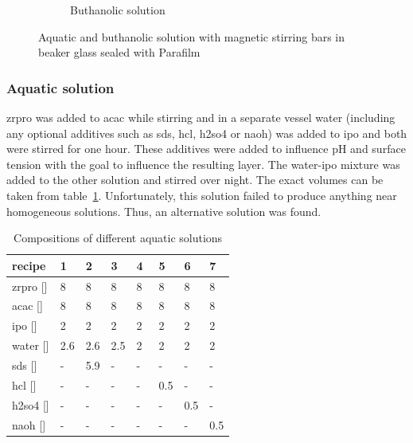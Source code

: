 \begin{figure}[htb]
\begin{subfigure}{0.49\textwidth}
		\label{fig:sol-bu}
		\caption{Buthanolic solution}
	\end{subfigure}
	\label{fig:sol}
	\caption{Aquatic and buthanolic solution with magnetic stirring bars in beaker glass sealed with Parafilm} 
\end{figure}

\subsubsection{Aquatic solution}
\gls{zrpro} was added to \gls{acac} while stirring and in a separate vessel \gls{water} 
(including any optional additives such as \gls{sds}, \gls{hcl}, \gls{h2so4} or \gls{naoh}) 
was added to \gls{ipo} and both were stirred for one hour. 
These additives were added to influence pH and surface tension with the goal to influence the resulting layer.
The \gls{water}-\gls{ipo} mixture was added to the other solution and stirred over night. 
The exact volumes can be taken from table~\ref{tab:rec1}.
Unfortunately, this solution failed to produce anything near homogeneous solutions. 
Thus, an alternative solution was found.
\begin{table}[h]
	\centering
	\caption{Compositions of different aquatic solutions}
	\label{tab:rec1}
	\begin{tabular}{llllllll}
		\hline
		recipe				&1		&2		&3		&4		&5		&6		&7\\
		\hline
		\gls{zrpro} [\ml{}]	&8		&8		&8		&8		&8		&8		&8\\
		\gls{acac}  [\ml{}]	&8		&8		&8		&8		&8		&8		&8\\
		\gls{ipo}   [\ml{}]	&2		&2		&2		&2		&2		&2		&2\\
		\gls{water} [\ml{}]	&2.6	&2.6	&2.5	&2~		&2		&2		&2\\
		\gls{sds}   [\mg{}]	&-		&5.9	&-		&-		&-		&-		&-\\
		\gls{hcl}   [\ml{}]	&-		&-		&-		&-		&0.5	&-		&-\\
		\gls{h2so4} [\ml{}]	&-		&-		&-		&-		&-		&0.5	&-\\
		\gls{naoh}  [\ml{}] &-		&-		&-		&-		&-		&-		&0.5\\
		\hline
	\end{tabular}
\end{table}
%
